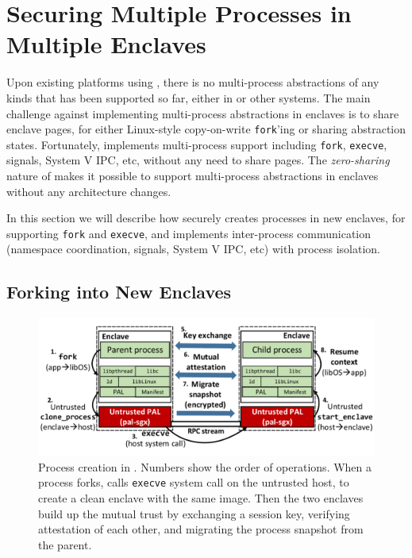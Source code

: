 \section{Securing Multiple Processes in Multiple Enclaves}
\label{sec:gsgx:multiproc}

Upon existing platforms using \sgx{}, there is no
multi-process abstractions of any kinds that has been supported so far,
either in \haven{} or other systems.
The main challenge against
implementing multi-process abstractions in enclaves
is to share enclave pages,
for either Linux-style copy-on-write {\tt fork}'ing or
sharing abstraction states.
Fortunately, \graphene{} implements multi-process support
including {\tt fork}, {\tt execve}, signals, System V IPC, etc,
without any need to share pages.
The {\it zero-sharing} nature of \graphene{} makes it possible
to support multi-process abstractions in enclaves
without any architecture changes.

In this section we will describe how \sysname{} securely creates
processes in new enclaves,
for supporting {\tt fork} and {\tt execve},
and implements inter-process communication
(namespace coordination, signals, System V IPC, etc)
with process isolation.

\subsection{Forking into New Enclaves}
\label{sec:gsgx:multiproc:fork}

\begin{figure}[t!]
\centering
\includegraphics[width=6in]{graphene-sgx/figures/fork.pdf}
\footnotesize
\caption[\sysname{}: process creation support.]
{Process creation in \sysname{}.
Numbers show the order of operations.
When a process forks, \sysname{} calls {\tt execve} system call
on the untrusted host,
to create a clean enclave with the same \libos{} image.
Then the two enclaves build up the mutual trust by
exchanging a session key, verifying attestation of each other,
and migrating the process snapshot from the parent.}
\label{fig:gsgx:fork}
\end{figure}

